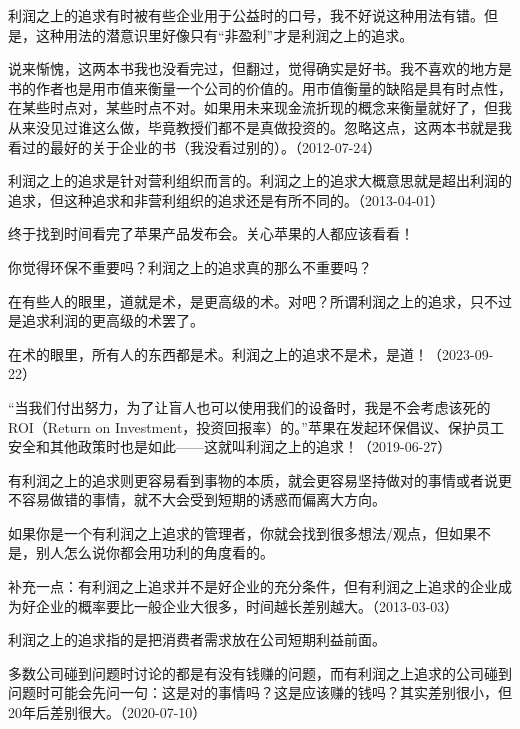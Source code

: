 利润之上的追求有时被有些企业用于公益时的口号，我不好说这种用法有错。但是，这种用法的潜意识里好像只有“非盈利”才是利润之上的追求。

说来惭愧，这两本书我也没看完过，但翻过，觉得确实是好书。我不喜欢的地方是书的作者也是用市值来衡量一个公司的价值的。用市值衡量的缺陷是具有时点性，在某些时点对，某些时点不对。如果用未来现金流折现的概念来衡量就好了，但我从来没见过谁这么做，毕竟教授们都不是真做投资的。忽略这点，这两本书就是我看过的最好的关于企业的书（我没看过别的）。（2012-07-24）

利润之上的追求是针对营利组织而言的。利润之上的追求大概意思就是超出利润的追求，但这种追求和非营利组织的追求还是有所不同的。（2013-04-01）

终于找到时间看完了苹果产品发布会。关心苹果的人都应该看看！


你觉得环保不重要吗？利润之上的追求真的那么不重要吗？

在有些人的眼里，道就是术，是更高级的术。对吧？所谓利润之上的追求，只不过是追求利润的更高级的术罢了。

在术的眼里，所有人的东西都是术。利润之上的追求不是术，是道！（2023-09-22）

“当我们付出努力，为了让盲人也可以使用我们的设备时，我是不会考虑该死的ROI（Return on Investment，投资回报率）的。”苹果在发起环保倡议、保护员工安全和其他政策时也是如此——这就叫利润之上的追求！（2019-06-27）


有利润之上的追求则更容易看到事物的本质，就会更容易坚持做对的事情或者说更不容易做错的事情，就不大会受到短期的诱惑而偏离大方向。

如果你是一个有利润之上追求的管理者，你就会找到很多想法/观点，但如果不是，别人怎么说你都会用功利的角度看的。

补充一点：有利润之上追求并不是好企业的充分条件，但有利润之上追求的企业成为好企业的概率要比一般企业大很多，时间越长差别越大。（2013-03-03）

利润之上的追求指的是把消费者需求放在公司短期利益前面。

多数公司碰到问题时讨论的都是有没有钱赚的问题，而有利润之上追求的公司碰到问题时可能会先问一句：这是对的事情吗？这是应该赚的钱吗？其实差别很小，但20年后差别很大。（2020-07-10）


